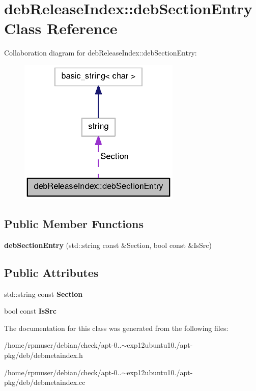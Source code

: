 \section{deb\-Release\-Index\-:\-:deb\-Section\-Entry \-Class \-Reference}
\label{classdebReleaseIndex_1_1debSectionEntry}


\-Collaboration diagram for deb\-Release\-Index\-:\-:deb\-Section\-Entry\-:
\nopagebreak
\begin{figure}[H]
\begin{center}
\leavevmode
\includegraphics[width=218pt]{classdebReleaseIndex_1_1debSectionEntry__coll__graph}
\end{center}
\end{figure}
\subsection*{\-Public \-Member \-Functions}
\begin{DoxyCompactItemize}
\item 
{\bfseries deb\-Section\-Entry} (std\-::string const \&\-Section, bool const \&\-Is\-Src)\label{classdebReleaseIndex_1_1debSectionEntry_a3944a47116dc65321d49e7f0afa7bb4a}

\end{DoxyCompactItemize}
\subsection*{\-Public \-Attributes}
\begin{DoxyCompactItemize}
\item 
std\-::string const {\bfseries \-Section}\label{classdebReleaseIndex_1_1debSectionEntry_a1f4483801b554c67c273faf8703e26a8}

\item 
bool const {\bfseries \-Is\-Src}\label{classdebReleaseIndex_1_1debSectionEntry_a3ce0c20623b23495675f34651b0a287f}

\end{DoxyCompactItemize}


\-The documentation for this class was generated from the following files\-:\begin{DoxyCompactItemize}
\item 
/home/rpmuser/debian/check/apt-\/0..$\sim$exp12ubuntu10./apt-\/pkg/deb/debmetaindex.\-h\item 
/home/rpmuser/debian/check/apt-\/0..$\sim$exp12ubuntu10./apt-\/pkg/deb/debmetaindex.\-cc\end{DoxyCompactItemize}
